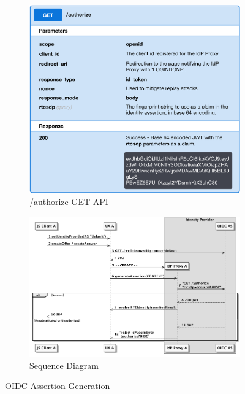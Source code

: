 \begin{figure}[tbp]
\begin{subfigure}{\textwidth}
\centering
    \includegraphics[scale=0.5]{images/OIDCProxyAPI}
\caption{/authorize GET API}
\end{subfigure}

\begin{subfigure}{\overflowingheadlen}
\centering
    \includegraphics[scale=0.55]{images/oidcAuthGen}
\caption{Sequence Diagram}
\end{subfigure}
\caption{OIDC Assertion Generation}
\label{idproxyimplem:oidcrequest}
\end{figure}

